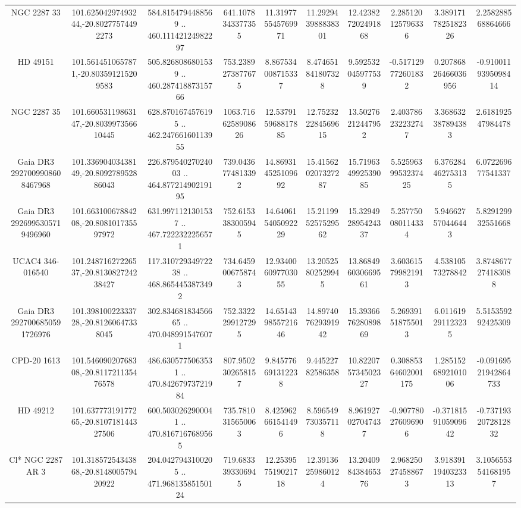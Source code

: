\begin{table}
\begin{tabular}{cccccccccc}
NGC  2287    33 & 101.62504297493244,-20.80277574492273 & 584.8154794488569 .. 460.11142124982297 & 641.1078343377355 & 11.319775545769971 & 11.292943988838301 & 12.423827202491868 & 2.285120125796336 & 3.3891717825182326 & 2.258288568864666 \\
HD  49151 & 101.5614510657871,-20.803591215209583 & 505.8268086801539 .. 460.28741887315766 & 753.2389273877675 & 8.867534008715337 & 8.474651841807328 & 9.592532045977539 & -0.517129772601832 & 0.20786826466036956 & -0.9100119395098414 \\
NGC  2287    35 & 101.66053119863147,-20.803997356610445 & 628.8701674576195 .. 462.24766160113955 & 1063.7166258908626 & 12.537915968817885 & 12.752322284569615 & 13.50276212447952 & 2.403786232232747 & 3.368632387894383 & 2.618192547984478 \\
Gaia DR3 2927009908608467968 & 101.33690403438149,-20.809278952886043 & 226.87954027024003 .. 464.87721490219195 & 739.0436774813392 & 14.869314525109692 & 15.415620207327287 & 15.719634992539085 & 5.5259639953237425 & 6.376284462753135 & 6.072269677541337 \\
Gaia DR3 2926995305719496960 & 101.66310067884208,-20.808101735597972 & 631.9971121301537 .. 467.7222322256571 & 752.6153383005945 & 14.640615405092229 & 15.211995257529562 & 15.329492895424337 & 5.257750080114334 & 5.946627570446443 & 5.829129932551668 \\
UCAC4 346-016540 & 101.24871627226537,-20.813082724238427 & 117.31072934972238 .. 468.8654453873492 & 734.6459006758743 & 12.934006097703055 & 13.20525802529945 & 13.868496030669561 & 3.603615799821913 & 4.53810573278842 & 3.8748677274183088 \\
Gaia DR3 2927006850591726976 & 101.39810022333728,-20.81260647338045 & 302.83468183456665 .. 470.0489915476071 & 752.3322299127295 & 14.651439855721646 & 14.897407629391942 & 15.393667628089869 & 5.269391518755013 & 6.011619291123235 & 5.515359292425309 \\
CPD-20  1613 & 101.54609020768308,-20.811721135476578 & 486.6305775063531 .. 470.84267973721984 & 807.9502302658157 & 9.845776691312238 & 9.44522782586358 & 10.822075734502327 & 0.30885364602001175 & 1.2851526892101006 & -0.09169521942864733 \\
HD  49212 & 101.63777319177265,-20.810718144327506 & 600.5030262900041 .. 470.8167167689565 & 735.7810315650063 & 8.425962661541496 & 8.596549730357118 & 8.961927027047437 & -0.907780276096906 & -0.3718159105909642 & -0.7371932072812832 \\
Cl* NGC 2287     AR       3 & 101.31857254343868,-20.814800579420922 & 204.0427943100205 .. 471.96813585150124 & 719.6833393306945 & 12.253957519021718 & 12.39136259860124 & 13.204098438465376 & 2.968250274588673 & 3.9183911940323313 & 3.1056553541681957 \\

\end{tabular}
\end{table}
